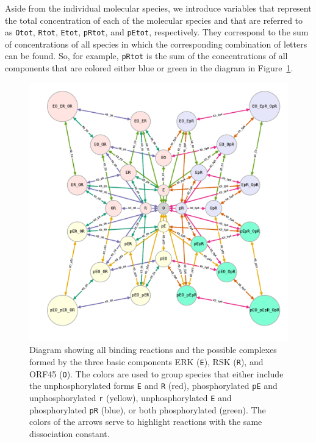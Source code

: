 \documentclass[12pt]{article}
\begin{document}
	Aside from the individual molecular species, we introduce variables
	that represent the total concentration of each of the molecular species
	and that are referred to as \texttt{Otot}, \texttt{Rtot}, \texttt{Etot},
	\texttt{pRtot}, and \texttt{pEtot}, respectively. They correspond
	to the sum of concentrations of all species in which the corresponding
	combination of letters can be found. So, for example, \texttt{pRtot}
	is the sum of the concentrations of all components that are colored
	either blue or green in the diagram in Figure~\ref{fig:diagram}.
	
	\begin{figure}[h!]
		\centering \includegraphics[width=\linewidth]{../res/diagram_all}
		\caption{Diagram showing all binding reactions and the possible complexes formed
			by the three basic components ERK (\texttt{E}), RSK (\texttt{R}),
			and ORF45 (\texttt{O}). The colors are used to group species that
			either include the unphosphorylated forms \texttt{E} and \texttt{R}
			(red), phosphorylated \texttt{pE} and unphosphorylated \texttt{r}
			(yellow), unphosphorylated \texttt{E} and phosphorylated \texttt{pR}
			(blue), or both phosphorylated (green). The colors of the arrows serve
			to highlight reactions with the same dissociation constant.}
		\label{fig:diagram} 
	\end{figure}
	
\end{document}
